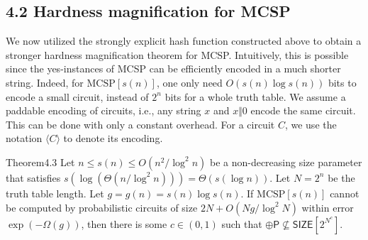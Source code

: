\subsection*{4.2 Hardness magnification for MCSP}
We now utilized the strongly explicit hash function constructed above to obtain a stronger hardness magnification theorem for MCSP. Intuitively, this is possible since the yes-instances of MCSP can be efficiently encoded in a much shorter string. Indeed, for $\mathrm{MCSP}[s(n)]$, one only need $O(s(n)\log s(n))$ bits to encode a small circuit, instead of $2^n$ bits for a whole truth table.
We assume a paddable encoding of circuits, i.e., any string $x$ and $x\Vert0$ encode the same circuit. This can be done with only a constant overhead. For a circuit $C$, we use the notation $\langle C\rangle$ to denote its encoding.
\begin{authorclaim}{Theorem4.3}
Let $n\le s(n)\le O(n^2/\log^2n)$ be a non-decreasing size parameter that satisfies $s(\log(\Theta(n/\log^2n)))=\Theta(s(\log n))$. Let $N=2^n$ be the truth table length. Let $g=g(n)=s(n)\log s(n)$. If $\mathrm{MCSP}[s(n)]$ cannot be computed by probabilistic circuits of size $2N+O(Ng/\log^2N)$ within error $\exp(-\Omega(g))$, then there is some $c\in(0,1)$ such that $\oplus\mathsf P\not\subseteq\mathsf{SIZE}[2^{N^c}]$.
\end{authorclaim}
